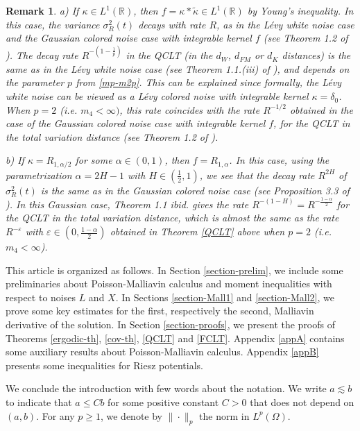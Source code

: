 \documentclass[12pt]{article}
\newtheorem{remark}[theorem]{Remark}
\def\bR{\mathbb{R}}
\newcommand{\les}{\lesssim}
\def\e{\varepsilon}
\def\k{\kappa}
\begin{document}
\begin{remark}
{\rm a) If $\k \in L^1(\bR)$, then $f=\k * \tilde{\k} \in L^1(\bR)$ by Young's inequality. In this case, the variance $\sigma_R^2(t)$ decays with rate $R$, as in the L\'evy white noise case and the Gaussian colored noise case with integrable kernel $f$ (see Theorem 1.2 of \cite{NZ22}). The decay rate $R^{-(1-\frac{1}{p})}$  in the QCLT (in the $d_{W}$, $d_{FM}$ or $d_K$ distances) is the same as in the L\'evy white noise case (see Theorem 1.1.(iii) of \cite{BZ24}), and depends on the parameter $p$ from \eqref{mp-m2p}. This can be explained since formally, the L\'evy white noise can be viewed as a L\'evy colored noise with integrable kernel $\k=\delta_0$. When $p=2$ (i.e. $m_4<\infty)$, this rate coincides with the rate $R^{-1/2}$ obtained in the case of the Gaussian colored noise case with integrable kernel $f$, for the QCLT in the total variation distance (see Theorem 1.2 of \cite{NZ22}).

\medskip

b) If $\k=R_{1,\alpha/2}$ for some $\alpha \in (0,1)$, then $f =R_{1,\alpha}$. In this case, using the parametrization $\alpha=2H-1$ with $H \in (\frac{1}{2},1)$, we see that the decay rate $R^{2H}$ of $\sigma_R^2(t)$ is the same as in the Gaussian colored noise case (see  Proposition 3.3 of \cite{DNZ20}). In this Gaussian case, Theorem 1.1 {\em ibid.} gives the rate $R^{-(1-H)}=R^{-\frac{1-\alpha}{2}}$ for the QCLT in the total variation distance, which is almost the same as the rate $R^{-\e}$ with $\e \in (0,\frac{1-\alpha}{2})$ obtained in Theorem \ref{QCLT} above when $p=2$ (i.e. $m_4<\infty$).
}
\end{remark}



This article is organized as follows. In Section \ref{section-prelim}, we include some preliminaries about Poisson-Malliavin calculus and moment inequalities with respect to noises $L$ and $X$. In Sections \ref{section-Mall1} and \ref{section-Mall2}, we prove some key estimates for the first, respectively the second,  Malliavin derivative of the solution. In Section \ref{section-proofs}, we present the proofs of Theorems \ref{ergodic-th}, \ref{cov-th}, \ref{QCLT} and \ref{FCLT}. Appendix \ref{appA} contains some auxiliary results about Poisson-Malliavin calculus. Appendix \ref{appB} presents some inequalities for Riesz potentials.

\medskip

We conclude the introduction with few words about the notation. We write $a\les b$ to indicate that $a \leq C b$ for some positive constant $C>0$ that does not depend on $(a,b)$. 
For any $p\geq 1$, we denote by $\|\cdot \|_p$ the norm in $L^p(\Omega)$.
\end{document}
